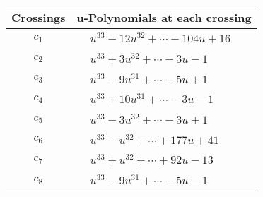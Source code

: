 \documentclass[1p]{elsarticle_modified}
\theoremstyle{definition}
\begin{document}
\begin{tabular}{m{50pt}|m{274pt}}
Crossings & \hspace{64pt}u-Polynomials at each crossing \\
\hline $$\begin{aligned}c_{1}\end{aligned}$$&$\begin{aligned}
&u^{33}-12 u^{32}+\cdots-104 u+16
\end{aligned}$\\
\hline $$\begin{aligned}c_{2}\end{aligned}$$&$\begin{aligned}
&u^{33}+3 u^{32}+\cdots-3 u-1
\end{aligned}$\\
\hline $$\begin{aligned}c_{3}\end{aligned}$$&$\begin{aligned}
&u^{33}-9 u^{31}+\cdots-5 u+1
\end{aligned}$\\
\hline $$\begin{aligned}c_{4}\end{aligned}$$&$\begin{aligned}
&u^{33}+10 u^{31}+\cdots-3 u-1
\end{aligned}$\\
\hline $$\begin{aligned}c_{5}\end{aligned}$$&$\begin{aligned}
&u^{33}-3 u^{32}+\cdots-3 u+1
\end{aligned}$\\
\hline $$\begin{aligned}c_{6}\end{aligned}$$&$\begin{aligned}
&u^{33}- u^{32}+\cdots+177 u+41
\end{aligned}$\\
\hline $$\begin{aligned}c_{7}\end{aligned}$$&$\begin{aligned}
&u^{33}+u^{32}+\cdots+92 u-13
\end{aligned}$\\
\hline $$\begin{aligned}c_{8}\end{aligned}$$&$\begin{aligned}
&u^{33}-9 u^{31}+\cdots-5 u-1
\end{aligned}$\\

\end{tabular}
\end{document}
